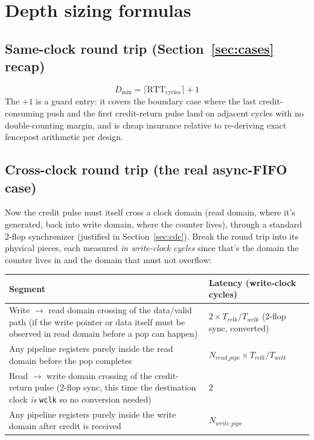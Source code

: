 \documentclass[12pt]{article}
\begin{document}
\clearpage
\section{Depth sizing formulas}
\label{sec:sizing}

\subsection{Same-clock round trip (Section~\ref{sec:cases} recap)}
\[
D_{\min} = \big\lceil \text{RTT}_{\text{cycles}} \big\rceil + 1
\]
The $+1$ is a guard entry: it covers the boundary case where the last
credit-consuming push and the first credit-return pulse land on adjacent
cycles with no double-counting margin, and is cheap insurance relative to
re-deriving exact fencepost arithmetic per design.

\subsection{Cross-clock round trip (the real async-FIFO case)}
\label{sec:sizing-cdc}

Now the credit pulse must itself cross a clock domain (read domain, where
it's generated, back into write domain, where the counter lives), through a
standard 2-flop synchronizer (justified in Section~\ref{sec:cdc}). Break
the round trip into its physical pieces, each measured \emph{in write-clock
cycles} since that's the domain the counter lives in and the domain that
must not overflow:

\begin{center}
\begin{tabular}{@{}p{5.6cm}p{9.6cm}@{}}
\toprule
\textbf{Segment} & \textbf{Latency (write-clock cycles)} \\
\midrule
Write $\to$ read domain crossing of the data/valid path (if the write
pointer or data itself must be observed in read domain before a pop can
happen) & $2 \times T_{rclk}/T_{wclk}$ (2-flop sync, converted) \\
Any pipeline registers purely inside the read domain before the pop
completes & $N_{read\_pipe} \times T_{rclk}/T_{wclk}$ \\
Read $\to$ write domain crossing of the credit-return pulse (2-flop sync,
this time the destination clock \emph{is} \texttt{wclk} so no conversion
needed) & $2$ \\
Any pipeline registers purely inside the write domain after credit is
received & $N_{write\_pipe}$ \\
\bottomrule
\end{tabular}
\end{center}
\end{document}
